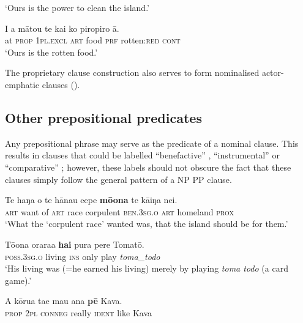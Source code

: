 \glt 
‘Ours is the power to clean the island.’ \textstyleExampleref{[R535.240]} 
\z

\ea\label{ex:9.89}
\gll I a mātou te kai ko piropiro {\ꞌ}ā. \\
at \textsc{prop} \textsc{1pl.excl} \textsc{art} food \textsc{prf} rotten:\textsc{red} \textsc{cont} \\

\glt 
‘Ours is the rotten food.’ \textstyleExampleref{[R310.263]} 
\z

The proprietary clause construction also serves to form nominalised actor-emphatic clauses ().

\subsection{Other prepositional predicates}\label{sec:9.4.3}

Any prepositional phrase may serve as the predicate of a nominal clause. This results in clauses that could be labelled “benefactive” , “instrumental”  or “comparative” ; however, these labels should not obscure the fact that these clauses simply follow the general pattern of a NP PP clause. 

\ea\label{ex:9.90}
\gll Te haŋa o te hānau {\ꞌ}e{\ꞌ}epe \textbf{mō{\ꞌ}ona} te kāiŋa nei. \\
\textsc{art} want of \textsc{art} race corpulent \textsc{ben.3sg.o} \textsc{art} homeland \textsc{prox} \\

\glt 
‘What the ‘corpulent race’ wanted was, that the island should be for them.’ \textstyleExampleref{[Ley-3-06.011]}
\z

\ea\label{ex:9.91}
\gll Tō{\ꞌ}ona orara{\ꞌ}a \textbf{hai} pura pere Tomatō. \\
\textsc{poss.3sg.o} living \textsc{ins} only play \textit{toma\_todo} \\

\glt 
‘His living was (=he earned his living) merely by playing \textit{toma todo} (a card game).’ \textstyleExampleref{[R250.145]} 
\z

\ea\label{ex:9.92}
\gll A kōrua ta{\ꞌ}e mau {\ꞌ}ana \textbf{pē} Kava. \\
\textsc{prop} \textsc{2pl} \textsc{conneg} really \textsc{ident} like Kava \\

